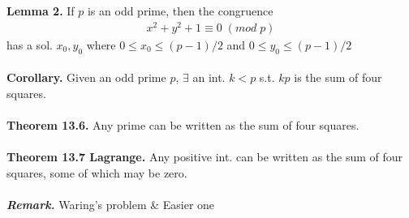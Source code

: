 \documentclass[a4paper,10pt]{article}
\begin{document}
\textbf{Lemma 2.} If $p$ is an odd prime, then the congruence 
\begin{align}
x^{2}+y^{2}+1\equiv 0 \; (mod \; p)
\end{align}
has a sol. $x_{0},y_{0}$ where $0\leq x_{0} \leq (p-1)/2$ and $0\leq y_{0} \leq (p-1)/2$ \\ \\
\textbf{Corollary.} Given an odd prime $p$, $\exists$ an int. $k<p$ s.t. $kp$ is the sum of four squares. \\ \\
\textbf{Theorem 13.6.} Any prime can be written as the sum of four squares. \\ \\
\textbf{Theorem 13.7 Lagrange.} Any positive int. can be written as the sum of four squares, some of which may be zero. \\ \\
\textit{\textbf{Remark.}} Waring's problem \& Easier one \\ \\
\end{document}
